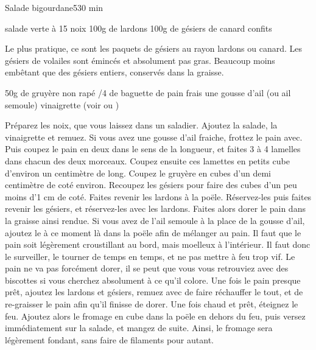 \begin{recette}{Salade bigourdane}{5}{30 min}{}
\begin{ingredients}
\ingredient salade verte
 à 15 noix
\ingredient 100g de lardons
\ingredient 100g de gésiers de canard confits
\begin{remarque}
Le plus pratique, ce sont les paquets de gésiers au rayon lardons ou canard. Les gésiers de volailes sont émincés et absolument pas gras. Beaucoup moins embêtant que des gésiers entiers, conservés dans la graisse.
\end{remarque}
\ingredient 50g de gruyère non rapé
/4 de baguette de pain frais
\ingredient une gousse d'ail (ou ail semoule)
\ingredient vinaigrette (voir  ou )

\end{ingredients}

\begin{preparation}
\etape Préparez les noix, que vous laissez dans un saladier. Ajoutez la salade, la vinaigrette et remuez.
\etape Si vous avez une gousse d'ail fraiche, frottez le pain avec. Puis coupez le pain en deux dans le sens de la longueur, et faites 3 à 4 lamelles dans chacun des deux morceaux. Coupez ensuite ces lamettes en petits cube d'environ un centimètre de long.
\etape Coupez le gruyère en cubes d'un demi centimètre de coté environ.
\etape Recoupez les gésiers pour faire des cubes d'un peu moins d'1 cm de coté.
\etape Faites revenir les lardons à la poële. 
\etape Réservez-les puis faites revenir les gésiers, et réservez-les avec les lardons.
\etape Faites alors dorer le pain dans la graisse ainsi rendue. Si vous avez de l'ail semoule à la place de la gousse d'ail, ajoutez le à ce moment là dans la poële afin de mélanger au pain. Il faut que le pain soit légèrement croustillant au bord, mais moelleux à l'intérieur. Il faut donc le surveiller, le tourner de temps en temps, et ne pas mettre à feu trop vif. Le pain ne va pas forcément dorer, il se peut que vous vous retrouviez avec des biscottes si vous cherchez absolument à ce qu'il colore. 
\etape Une fois le pain presque prêt, ajoutez les lardons et gésiers, remuez avec de faire réchauffer le tout, et de re-graisser le pain afin qu'il finisse de dorer. 
\etape Une fois chaud et prêt, éteignez le feu. Ajoutez alors le fromage en cube dans la poële en dehors du feu, puis versez immédiatement sur la salade, et mangez de suite. Ainsi, le fromage sera légèrement fondant, sans faire de filaments pour autant.
\end{preparation}
\end{recette}

